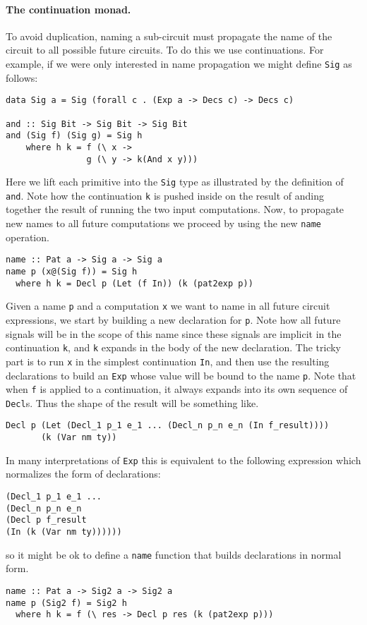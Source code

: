 \documentclass[10pt,twoside]{article}
\begin{document}
\paragraph{The continuation monad.} To avoid duplication, naming a 
sub-circuit must propagate the name of the circuit to all possible
future circuits. To do this we use continuations.
For example, if we were only interested in name propagation we might
define {\tt Sig} as follows:
\begin{verbatim}
data Sig a = Sig (forall c . (Exp a -> Decs c) -> Decs c)

and :: Sig Bit -> Sig Bit -> Sig Bit
and (Sig f) (Sig g) = Sig h  
    where h k = f (\ x -> 
                g (\ y -> k(And x y)))
\end{verbatim}
Here we lift each primitive into the {\tt Sig} type as illustrated
by the definition of {\tt and}. Note how the continuation {\tt k}
is pushed inside on the result of anding together the result of
running the two input computations. 
Now,  to propagate new names to all future computations we proceed
by using the new {\tt name} operation.
\begin{verbatim}
name :: Pat a -> Sig a -> Sig a
name p (x@(Sig f)) = Sig h
  where h k = Decl p (Let (f In)) (k (pat2exp p))
\end{verbatim}
Given a name {\tt p} and a computation {\tt x} we want to name in all
future circuit expressions, we start by building a new declaration
for {\tt p}. Note how all future signals will be in the scope
of this name since these signals are implicit in the continuation {\tt k},
and {\tt k} expands in the body of the new declaration. The tricky part
is to run {\tt x} in the simplest continuation {\tt In}, and then
use the resulting declarations to build an {\tt Exp} whose
value will be bound to the name {\tt p}. Note that when {\tt f} is applied
to a continuation, it  always expands into its own sequence of {\tt Decl}s.
Thus the shape of the result will be something like.

\begin{verbatim}
Decl p (Let (Decl_1 p_1 e_1 ... (Decl_n p_n e_n (In f_result))))
       (k (Var nm ty))
\end{verbatim}
In many interpretations of {\tt Exp} this is equivalent to the following
expression which normalizes the form of declarations:
\begin{verbatim}
(Decl_1 p_1 e_1 ... 
(Decl_n p_n e_n
(Decl p f_result
(In (k (Var nm ty))))))
\end{verbatim}
so it might be ok to define a {\tt name} function that builds declarations
in normal form.
\begin{verbatim}
name :: Pat a -> Sig2 a -> Sig2 a
name p (Sig2 f) = Sig2 h
  where h k = f (\ res -> Decl p res (k (pat2exp p)))
\end{verbatim}
\end{document}
